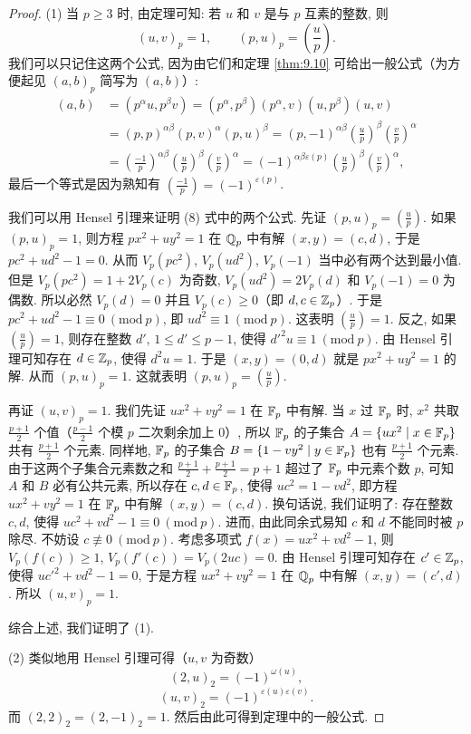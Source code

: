 \begin{proof}
(1) 当 $p\geqslant 3$ 时, 由定理可知: 若 $u$ 和 $v$ 是与 $p$ 互素的整数, 则
\begin{equation}\tag{8}
  (u,v)_p=1,\qquad(p,u)_p=\left(\frac{u}{p}\right).
\end{equation}
我们可以只记住这两个公式, 因为由它们和定理 \ref{thm:9.10} 可给出一般公式（为方便起见 $(a,b)_p$ 简写为 $(a,b)$）:
\begin{align*}
  (a,b)&=(p^{\alpha}u,p^{\beta}v)=(p^{\alpha},p^{\beta})(p^{\alpha},v)(u,p^{\beta})(u,v)\\
  &=(p,p)^{\alpha\beta}(p,v)^{\alpha}(p,u)^{\beta}
  =(p,-1)^{\alpha\beta}\left(\frac{u}{p}\right)^{\beta}\left(\frac{v}{p}\right)^{\alpha}\\
  &=\left(\frac{-1}{p}\right)^{\alpha\beta}
  \left(\frac{u}{p}\right)^{\beta}\left(\frac{v}{p}\right)^{\alpha}
  =(-1)^{\alpha\beta\varepsilon(p)}\left(\frac{u}{p}\right)^{\beta}\left(\frac{v}{p}\right)^{\alpha},
\end{align*}
最后一个等式是因为熟知有 $\left(\frac{-1}{p}\right)=(-1)^{\varepsilon(p)}$.

我们可以用 Hensel 引理来证明 (8) 式中的两个公式. 先证 $(p,u)_p=\left(\frac{u}{p}\right)$. 如果 $(p,u)_p=1$, 则方程 $px^2+uy^2=1$ 在 $\mathbb{Q}_p$ 中有解 $(x,y)=(c,d)$, 于是 $pc^2+ud^2-1=0$. 从而 $V_p(pc^2)$, $V_p(ud^2)$, $V_p(-1)$ 当中必有两个达到最小值. 但是 $V_p(pc^2)=1+2V_p(c)$ 为奇数, $V_p(ud^2)=2V_p(d)$ 和 $V_p(-1)=0$ 为偶数. 所以必然 $V_p(d)=0$ 并且 $V_p(c)\geqslant 0$（即 $d,c\in\mathbb{Z}_p$）. 于是 $pc^2+ud^2-1\equiv 0\ (\mathrm{mod}\ p)$, 即 $ud^2\equiv 1\ (\mathrm{mod}\ p)$. 这表明 $\left(\frac{u}{p}\right)=1$. 反之, 如果 $\left(\frac{u}{p}\right)=1$, 则存在整数 $d'$, $1\leqslant d'\leqslant p-1$, 使得 $d'^2u\equiv 1\ (\mathrm{mod}\ p)$. 由 Hensel 引理可知存在 $d\in\mathbb{Z}_p$, 使得 $d^2u=1$. 于是 $(x,y)=(0,d)$ 就是 $px^2+uy^2=1$ 的解. 从而 $(p,u)_p=1$. 这就表明 $(p,u)_p=\left(\frac{u}{p}\right)$.

再证 $(u,v)_p=1$. 我们先证 $ux^2+vy^2=1$ 在 $\mathbb{F}_p$ 中有解. 当 $x$ 过 $\mathbb{F}_p$ 时, $x^2$ 共取 $\frac{p+1}{2}$ 个值（$\frac{p-1}{2}$ 个模 $p$ 二次剩余加上 $0$）, 所以 $\mathbb{F}_p$ 的子集合 $A=\{ux^2\mid x\in\mathbb{F}_p\}$ 共有 $\frac{p+1}{2}$ 个元素. 同样地, $\mathbb{F}_p$ 的子集合 $B=\{1-vy^2\mid y\in\mathbb{F}_p\}$ 也有 $\frac{p+1}{2}$ 个元素. 由于这两个子集合元素数之和 $\frac{p+1}{2}+\frac{p+1}{2}=p+1$ 超过了 $\mathbb{F}_p$ 中元素个数 $p$, 可知 $A$ 和 $B$ 必有公共元素, 所以存在 $c,d\in\mathbb{F}_p$, 使得 $uc^2=1-vd^2$, 即方程 $ux^2+vy^2=1$ 在 $\mathbb{F}_p$ 中有解 $(x,y)=(c,d)$. 换句话说, 我们证明了: 存在整数 $c,d$, 使得 $uc^2+vd^2-1\equiv 0\ (\mathrm{mod}\ p)$. 进而, 由此同余式易知 $c$ 和 $d$ 不能同时被 $p$ 除尽. 不妨设 $c\not\equiv 0\ (\mathrm{mod}\ p)$. 考虑多项式 $f(x)=ux^2+vd^2-1$, 则 $V_p(f(c))\geqslant 1$, $V_p(f'(c))=V_p(2uc)=0$. 由 Hensel 引理可知存在 $c'\in\mathbb{Z}_p$, 使得 $uc'^2+vd^2-1=0$, 于是方程 $ux^2+vy^2=1$ 在 $\mathbb{Q}_p$ 中有解 $(x,y)=(c',d)$. 所以 $(u,v)_p=1$.

综合上述, 我们证明了 (1).

(2) 类似地用 Hensel 引理可得（$u,v$ 为奇数）
\[
  (2,u)_2=(-1)^{\omega(u)},
\]
\[
  (u,v)_2=(-1)^{\varepsilon(u)\varepsilon(v)}.
\]
而 $(2,2)_2=(2,-1)_2=1$. 然后由此可得到定理中的一般公式.
\end{proof}

